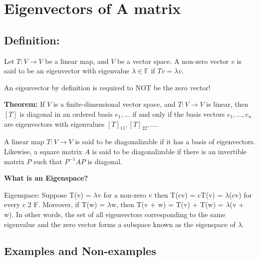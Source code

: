 \section{Eigenvectors of A matrix}

\subsection{Definition:} 

\begin{outline}
Let $T : V \rightarrow V$ be a linear map, and $V$ be a vector space. A non-zero vector $v$ is said to be an eigenvector with eigenvalue $\lambda \in \mathbb{F}$ if $Tv = \lambda v$. 
\end{outline}


An eigenvector by definition is required to NOT be the zero vector!

\textbf{Theorem:} If $V$ is a finite-dimensional vector space, and $T : V \rightarrow V$ is linear, then $[T]$ is diagonal in an ordered basis $e_1, \ldots$ if and only if the basis vectors $e_1, \ldots, e_n$ are eigenvectors with eigenvalues $[T]_{11}, [T]_{22}, \ldots$.

A linear map $T : V \rightarrow V$ is said to be diagonalizable if it has a basis of eigenvectors. Likewise, a square matrix $A$ is said to be diagonalizable if there is an invertible matrix $P$ such that $P^{-1}AP$ is diagonal.

\textbf{What is an Eigenspace?}

Eigenspace: Suppose T(v) = $\lambda$v for a non-zero v then
T(cv) = cT(v) = $\lambda$(cv) for every c 2 F. Moreover, if
T(w) = $\lambda$w, then T(v + w) = T(v) + T(w) = $\lambda$(v + w). In
other words, the set of all eigenvectors corresponding to the
same eigenvalue and the zero vector forms a subspace
known as the eigenspace of $\lambda$.


\subsection{Examples and Non-examples}

